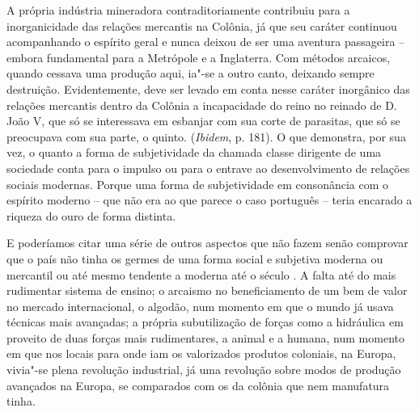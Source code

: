 A própria indústria mineradora contraditoriamente contribuiu para a
inorganicidade das relações mercantis na Colônia, já que seu caráter
continuou acompanhando o espírito geral e nunca deixou de ser uma
aventura passageira -- embora fundamental para a Metrópole e a
Inglaterra. Com métodos arcaicos, quando cessava uma produção aqui,
ia"-se a outro canto, deixando sempre destruição. Evidentemente, deve ser
levado em conta nesse caráter inorgânico das relações mercantis dentro
da Colônia a incapacidade do reino no reinado de D. João V, que só se
interessava em esbanjar com sua corte de parasitas, que só se preocupava
com sua parte, o quinto. (\emph{Ibidem}, p. 181). O que demonstra, por
sua vez, o quanto a forma de subjetividade da chamada classe dirigente
de uma sociedade conta para o impulso ou para o entrave ao
desenvolvimento de relações sociais modernas. Porque uma forma de
subjetividade em consonância com o espírito moderno -- que não era ao
que parece o caso português -- teria encarado a riqueza do ouro de forma
distinta.

E poderíamos citar uma série de outros aspectos que não fazem senão
comprovar que o país não tinha os germes de uma forma social e subjetiva
moderna ou mercantil ou até mesmo tendente a moderna até o século . A
falta até do mais rudimentar sistema de ensino; o arcaismo no
beneficiamento de um bem de valor no mercado internacional, o algodão,
num momento em que o mundo já usava técnicas mais avançadas; a própria
subutilização de forças como a hidráulica em proveito de duas forças
mais rudimentares, a animal e a humana, num momento em que nos locais
para onde iam os valorizados produtos coloniais, na Europa, vivia"-se
plena revolução industrial, já uma revolução sobre modos de produção
avançados na Europa, se comparados com os da colônia que nem manufatura
tinha.

